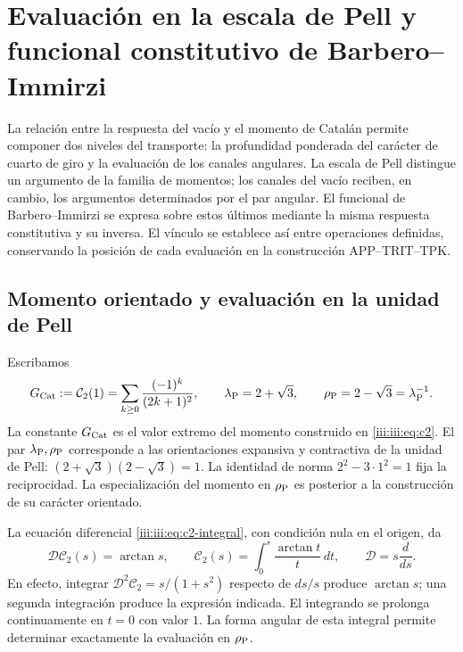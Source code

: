 \section{Evaluación en la escala de Pell y funcional constitutivo de Barbero--Immirzi}
\label{iii:iii:sec:pell-barbero}

La relación entre la respuesta del vacío y el momento de Catalán permite
componer dos niveles del transporte: la profundidad ponderada del carácter
de cuarto de giro y la evaluación de los canales angulares. La escala de
Pell distingue un argumento de la familia de momentos; los canales del
vacío reciben, en cambio, los argumentos determinados por el par angular.
El funcional de Barbero--Immirzi se expresa sobre estos últimos mediante
la misma respuesta constitutiva y su inversa. El vínculo se establece así
entre operaciones definidas, conservando la posición de cada evaluación
en la construcción APP--TRIT--TPK.

\subsection{Momento orientado y evaluación en la unidad de Pell}

Escribamos
\begin{equation}
 G_{\rm Cat}:=\mathcal C_2(1)
 =\sum_{k\geq0}\frac{(-1)^k}{(2k+1)^2},\qquad
 \lambda_{\rm P}=2+\sqrt3,\qquad
 \rho_{\rm P}=2-\sqrt3=\lambda_{\rm P}^{-1}.
 \label{iii:iii:eq:pell-scales}
\end{equation}
La constante $G_{\rm Cat}$ es el valor extremo del momento construido en
\eqref{iii:iii:eq:c2}. El par $\lambda_{\rm P},\rho_{\rm P}$ corresponde a
las orientaciones expansiva y contractiva de la unidad de Pell:
$(2+\sqrt3)(2-\sqrt3)=1$. La identidad de norma $2^2-3\cdot1^2=1$
fija la reciprocidad. La especialización del momento en $\rho_{\rm P}$
es posterior a la construcción de su carácter orientado.

La ecuación diferencial \eqref{iii:iii:eq:c2-integral}, con condición nula
en el origen, da
\begin{equation}
 \mathcal D\mathcal C_2(s)=\arctan s,\qquad
 \mathcal C_2(s)=\int_0^s\frac{\arctan t}{t}\,dt,
 \qquad \mathcal D=s\frac{d}{ds}.
 \label{iii:iii:eq:pell-moment-integral}
\end{equation}
En efecto, integrar $\mathcal D^2\mathcal C_2=s/(1+s^2)$ respecto de
$ds/s$ produce $\arctan s$; una segunda integración produce la expresión
indicada. El integrando se prolonga continuamente en $t=0$ con valor $1$.
La forma angular de esta integral permite determinar exactamente la
evaluación en $\rho_{\rm P}$.

